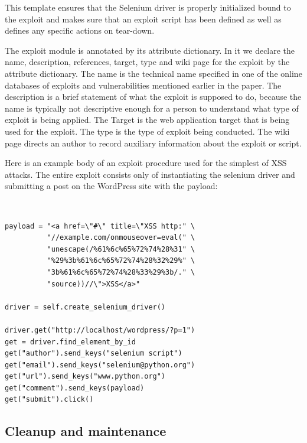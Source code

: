 \documentclass[letterpaper,twocolumn,10pt]{article}
\begin{document}
This template ensures that the Selenium driver is properly initialized bound to the exploit and makes sure that an exploit script has been defined as well as defines any specific actions on tear-down.\par

The exploit module is annotated by its attribute dictionary. In it we declare the name, description, references, target, type and wiki page for the exploit by the attribute dictionary.  The name is the technical name specified in one of the online databases of exploits and vulnerabilities mentioned earlier in the paper.  The description is a brief statement of what the exploit is supposed to do, because the name is typically not descriptive enough for a person to understand what type of exploit is being applied.  The Target is the web application target that is being used for the exploit.  The type is the type of exploit being conducted.  The wiki page directs an author to record auxiliary information about the exploit or script.

Here is an example body of an exploit procedure used for the simplest of XSS attacks.  The entire exploit consists only of instantiating the selenium driver and submitting a post on the WordPress site with the payload: 

\begin{minipage}{\textwidth}
{\tt \footnotesize
\begin{lstlisting}
payload = "<a href=\"#\" title=\"XSS http:" \
          "//example.com/onmouseover=eval(" \
          "unescape(/%61%6c%65%72%74%28%31" \
          "%29%3b%61%6c%65%72%74%28%32%29%" \
          "3b%61%6c%65%72%74%28%33%29%3b/." \
          "source))//\">XSS</a>"

driver = self.create_selenium_driver()

driver.get("http://localhost/wordpress/?p=1")
get = driver.find_element_by_id
get("author").send_keys("selenium script")
get("email").send_keys("selenium@python.org")
get("url").send_keys("www.python.org")
get("comment").send_keys(payload)
get("submit").click()
\end{lstlisting}
}
\end{minipage}

\subsection {Cleanup and maintenance}
\end{document}
